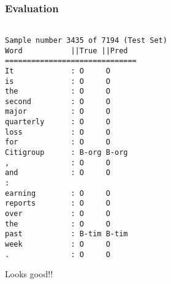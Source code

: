 \begin{frame}[fragile]\frametitle{Evaluation}

\begin{lstlisting}

Sample number 3435 of 7194 (Test Set)
Word           ||True ||Pred
==============================
It             : O     O
is             : O     O
the            : O     O
second         : O     O
major          : O     O
quarterly      : O     O
loss           : O     O
for            : O     O
Citigroup      : B-org B-org
,              : O     O
and            : O     O
:
earning        : O     O
reports        : O     O
over           : O     O
the            : O     O
past           : B-tim B-tim
week           : O     O
.              : O     O
\end{lstlisting}

Looks good!!
\end{frame}

